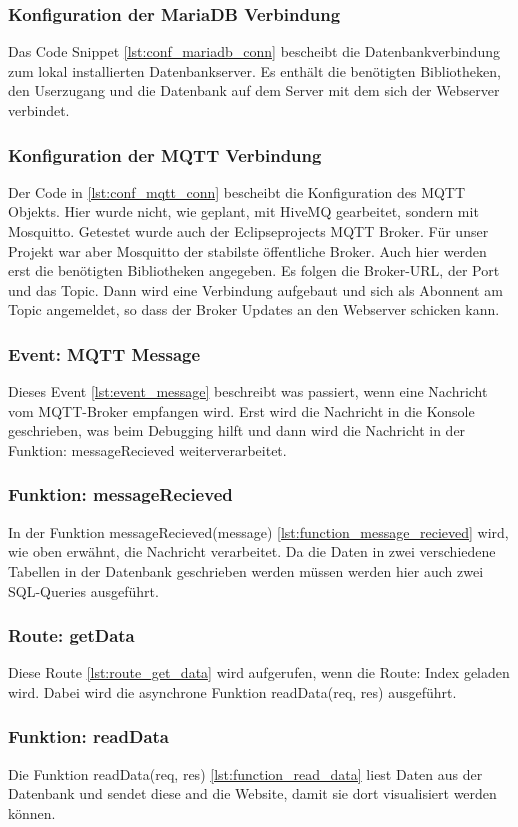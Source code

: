 \subsubsection{Konfiguration der MariaDB Verbindung}
Das Code Snippet \ref{lst:conf_mariadb_conn} bescheibt die Datenbankverbindung zum lokal installierten Datenbankserver. Es enthält die benötigten Bibliotheken, den Userzugang und die Datenbank auf dem Server mit dem sich der Webserver verbindet.


\subsubsection{Konfiguration der MQTT Verbindung}
Der Code in \ref{lst:conf_mqtt_conn} bescheibt die Konfiguration des MQTT Objekts. Hier wurde nicht, wie geplant, mit HiveMQ gearbeitet, sondern mit Mosquitto. Getestet wurde auch der Eclipseprojects MQTT Broker. Für unser Projekt war aber Mosquitto der stabilste öffentliche Broker. Auch hier werden erst die benötigten Bibliotheken angegeben. Es folgen die Broker-URL, der Port und das Topic. Dann wird eine Verbindung aufgebaut und sich als Abonnent am Topic angemeldet, so dass der Broker Updates an den Webserver schicken kann.

\subsubsection{Event: MQTT Message}
Dieses Event \ref{lst:event_message} beschreibt was passiert, wenn eine Nachricht vom MQTT-Broker empfangen wird. Erst wird die Nachricht in die Konsole geschrieben, was beim Debugging hilft und dann wird die Nachricht in der Funktion: messageRecieved weiterverarbeitet.

\subsubsection{Funktion: messageRecieved}
In der Funktion messageRecieved(message) \ref{lst:function_message_recieved} wird, wie oben erwähnt, die Nachricht verarbeitet. Da die Daten in zwei verschiedene Tabellen in der Datenbank geschrieben werden müssen werden hier auch zwei SQL-Queries ausgeführt.

\subsubsection{Route: getData}
Diese Route \ref{lst:route_get_data} wird aufgerufen, wenn die Route: Index geladen wird. Dabei wird die asynchrone Funktion readData(req, res) ausgeführt.

\subsubsection{Funktion: readData}
Die Funktion readData(req, res) \ref{lst:function_read_data} liest Daten aus der Datenbank und sendet diese and die Website, damit sie dort visualisiert werden können.